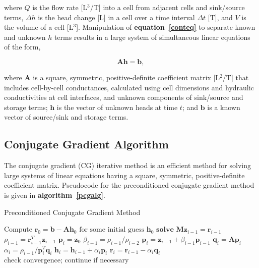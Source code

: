\documentclass[12pt]{article}
\begin{document}
\noindent
where $Q$ is the flow rate [L$^{3}$/T] into a cell from adjacent cells and sink/source terms, $\Delta h$ is the head change [L] in a cell over a time interval $\Delta t$ [T], and $V$ is the volume of a cell [L$^{3}$]. Manipulation of \textbf{equation~\ref{conteq}} to separate known and unknown $h$ terms results in a large system of simultaneous linear equations of the form, 

\begin{equation}
	\label{lineareq}
	\mathbf{Ah} = \mathbf{b},
\end{equation}

\noindent
where $\mathbf{A}$ is a  square, symmetric, positive-definite coefficient matrix [L$^{2}$/T] that includes cell-by-cell conductances, calculated using cell dimensions and hydraulic conductivities at cell interfaces, and unknown components of sink/source and storage terms; $\mathbf{h}$ is the vector of unknown heads at time $t$; and $\mathbf{b}$ is a known vector of source/sink and storage terms.

\subsection*{Conjugate Gradient Algorithm}

The conjugate gradient (CG) iterative method is an efficient method for solving large systems of linear equations having a square, symmetric, positive-definite coefficient matrix. Pseudocode for the preconditioned conjugate gradient method is given in \textbf{algorithm~\ref{pcgalg}}. 

\begin{algorithm}
\caption{Preconditioned Conjugate Gradient Method}
\label{pcgalg}
\begin{algorithmic}[1]
	\State $\text{Compute } \mathbf{r}_{0} = \mathbf{b - Ah}_{0} \text{ for some initial guess } \mathbf{h}_{0}$
		\State $\textbf{solve } \mathbf{Mz}_{i-1} = \mathbf{r}_{i-1}$ 
		\State $\rho_{i-1} = \mathbf{r}^T_{i-1} \mathbf{z}_{i-1}$
			\State $\mathbf{p}_i = \mathbf{z}_0$
		\Else
			\State $\beta_{i-1} = \rho_{i-1} / \rho_{i-2}$
			\State $\mathbf{p}_i = \mathbf{z}_{i-1} + \beta_{i-1} \mathbf{p}_{i-1}$
		\EndIf
		\State $\mathbf{q}_i = \mathbf{Ap}_{i}$
		\State $\alpha_i = \rho_{i-1} / \mathbf{p}^T_i \mathbf{q}_{i}$ 
		\State $\mathbf{h}_i = \mathbf{h}_{i-1} + \alpha_i \mathbf{p}_{i}$  
		\State $\mathbf{r}_i = \mathbf{r}_{i-1} - \alpha_i \mathbf{q}_{i}$ 
		\State $\text{check convergence; continue if necessary}$
	\EndFor
\end{algorithmic}
\end{algorithm}
\end{document}
